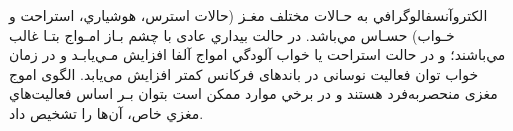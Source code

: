  الكتروآنسفالوگرافي به حـالات مختلف مغـز (حالات استرس، هوشياري، استراحت و خـواب) حسـاس مي‌باشد. در حالت بيداري عادی با چشم بـاز امـواج بتـا غالب مي‌باشند؛ و در حالت استراحت يا خواب آلودگي امواج آلفا افزايش مـي‌يابـد و در زمان خواب توان فعالیت نوسانی در باندهای فرکانس کمتر افزایش می‌یابد.
 الگوی اموج مغزی منحصربه‌فرد هستند و در برخي موارد ممكن است بتوان بـر اساس فعاليت‌هاي مغزي خاص، آن‌ها را تشخيص داد.
